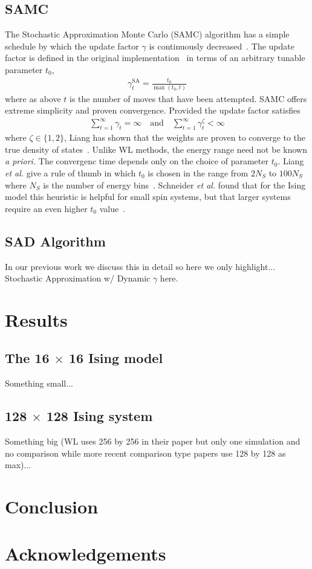 \documentclass[letterpaper,twocolumn,amsmath,amssymb,pre,aps,10pt]{revtex4-1}
\begin{document}
\subsection{SAMC}
The Stochastic Approximation Monte Carlo (SAMC) algorithm has a simple
schedule by which the update factor $\gamma$ is continuously
decreased~\cite{liang2007stochastic, werlich2015stochastic,
schneider2017convergence}.  The update factor is defined in the
original implementation~\cite{liang2007stochastic} in terms of an
arbitrary tunable parameter $t_0$,
\begin{align}
\gamma_{t}^{\text{SA}} =\frac{t_0}{\max(t_0,t)}
\end{align}
where as above $t$ is the number of moves that have been attempted.
SAMC offers extreme simplicity and proven convergence.
Provided the update factor satisfies
\begin{align}
\sum_{t=1}^\infty \gamma_{t} = \infty \quad\textrm{and}\quad
\sum_{t=1}^\infty \gamma_{t}^\zeta < \infty
\end{align}
where $\zeta \in \{1,2\}$, Liang has shown that the weights are proven
to converge to the true density of states~\cite{liang2006theory,
liang2007stochastic}.  Unlike WL methods, the energy range need not be
known \emph{a priori.}  The convergenc time depends only on the choice of
parameter $t_0$.  Liang \emph{et al.} give a rule of thumb in
which $t_0$ is chosen in the range from $2N_S$ to $100N_S$ where $N_S$
is the number of energy bins~\cite{liang2007stochastic}.  Schneider
\emph{et al.} found that for the Ising model this heuristic is helpful
for small spin systems, but that larger systems require an even higher
$t_0$ value~\cite{schneider2017convergence}.

\subsection{SAD Algorithm}\label{sec:sad}
In our previous work we discuss this in detail so here we only highlight...
Stochastic Approximation w/ Dynamic $\gamma$ here.

\section{Results}

\subsection{The 16 $\times$ 16 Ising model}
Something small...
\subsection{128 $\times$ 128 Ising system}
Something big (WL uses 256 by 256 in their paper but only one simulation and
no comparison while more recent comparison type papers use 128 by 128 as max)...

\section{Conclusion}

\section{Acknowledgements}

\end{document}
